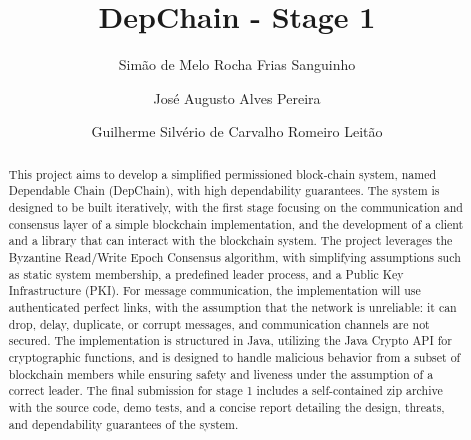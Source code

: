 \documentclass[runningheads]{llncs}
\begin{document}
%
\title{DepChain - Stage 1}
%
%
\author{Simão de Melo Rocha Frias Sanguinho \and
José Augusto Alves Pereira \and
Guilherme Silvério de Carvalho Romeiro Leitão}
%
%
%
\maketitle              %
%
\begin{abstract}
This project aims to develop a simplified permissioned block-chain system, named Dependable Chain (DepChain), with high dependability guarantees. The system is designed to be built iteratively, with the first stage focusing on the communication and consensus layer of a simple blockchain implementation, and the development of a client and a library that can interact with the blockchain system. The project leverages the Byzantine Read/Write Epoch Consensus algorithm, with simplifying assumptions such as static system membership, a predefined leader process, and a Public Key Infrastructure (PKI). For message communication, the implementation will use authenticated perfect links, with the assumption that the  network  is  unreliable:  it  can  drop,  delay,  duplicate,  or  corrupt 
messages, and communication channels are not secured. The implementation is structured in Java, utilizing the Java Crypto API for cryptographic functions, and is designed to handle malicious behavior from a subset of blockchain members while ensuring safety and liveness under the assumption of a correct leader. The final submission for stage 1 includes a self-contained zip archive with the source code, demo tests, and a concise report detailing the design, threats, and dependability guarantees of the system.
%
\end{abstract}
%
\end{document}

